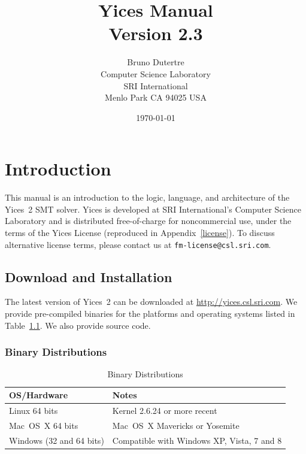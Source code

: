 \documentclass[11pt,twoside,fleqn,openright,titlepage]{cslreport}
\begin{document}
\begin{titlepage}
\date{\today}
\author{Bruno Dutertre\\
Computer Science Laboratory\\
SRI International\\
Menlo Park CA 94025 USA
}
\title{\bf Yices Manual\\[1em]
Version 2.3}
\end{titlepage}

\maketitle
\cleardoublepageblank
\tableofcontents
\cleardoublepage
\setcounter{page}{0}


\chapter{Introduction}

This  manual   is  an  introduction   to  the  logic,   language,  and
architecture  of the  Yices~2 SMT  solver. Yices  is developed  at SRI
International's  Computer   Science  Laboratory  and   is  distributed
free-of-charge for  noncommercial use,  under the  terms of  the Yices
License   (reproduced   in    Appendix~\ref{license}).    To   discuss
alternative     license     terms,     please    contact     us     at
\texttt{fm-license@csl.sri.com}.


\section{Download and Installation}

The    latest   version    of   Yices~2    can   be    downloaded   at
\url{http://yices.csl.sri.com}.  We  provide pre-compiled binaries for
the platforms and operating systems listed in Table~\ref{versions}. We
also provide source code.

\subsection{Binary Distributions}

\begin{table}
\begin{center}
\renewcommand{\arraystretch}{1.1}
\begin{tabular}{|l|l|}
\hline
\textbf{OS/Hardware} & \textbf{Notes} \\
\hline
\hline
Linux 64 bits & Kernel 2.6.24 or more recent \\
\hline
Mac~OS~X 64 bits &  Mac~OS~X Mavericks or Yosemite \\
\hline
Windows (32 and 64 bits) & Compatible with Windows XP, Vista, 7 and 8\\
\hline
\end{tabular}
\end{center}
\caption{Binary Distributions}
\label{versions}
\end{table}
\end{document}
